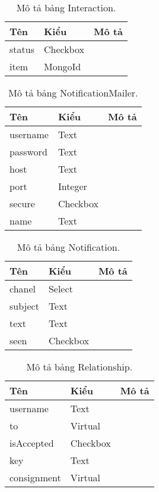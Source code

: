 \begin{table}[h!]
\begin{center}
\begin{tabular}{ |l|l|l| } 
	\hline
	Tên & Kiểu & Mô tả \\
	\hline
	status & Checkbox & \dotfill \\
item & MongoId & \dotfill \\ 
	\hline
\end{tabular}
	\caption{Mô tả bảng Interaction.}
	\label{table:Interaction}
\end{center}
\end{table}


\begin{table}[h!]
\begin{center}
\begin{tabular}{ |l|l|l| } 
	\hline
	Tên & Kiểu & Mô tả \\
	\hline
	username & Text & \dotfill \\
password & Text & \dotfill \\
host & Text & \dotfill \\
port & Integer & \dotfill \\
secure & Checkbox & \dotfill \\
name & Text & \dotfill \\ 
	\hline
\end{tabular}
	\caption{Mô tả bảng NotificationMailer.}
	\label{table:NotificationMailer}
\end{center}
\end{table}


\begin{table}[h!]
\begin{center}
\begin{tabular}{ |l|l|l| } 
	\hline
	Tên & Kiểu & Mô tả \\
	\hline
	chanel & Select & \dotfill \\
subject & Text & \dotfill \\
text & Text & \dotfill \\
seen & Checkbox & \dotfill \\ 
	\hline
\end{tabular}
	\caption{Mô tả bảng Notification.}
	\label{table:Notification}
\end{center}
\end{table}


\begin{table}[h!]
\begin{center}
\begin{tabular}{ |l|l|l| } 
	\hline
	Tên & Kiểu & Mô tả \\
	\hline
	username & Text & \dotfill \\
to & Virtual & \dotfill \\
isAccepted & Checkbox & \dotfill \\
key & Text & \dotfill \\
consignment & Virtual & \dotfill \\ 
	\hline
\end{tabular}
	\caption{Mô tả bảng Relationship.}
	\label{table:Relationship}
\end{center}
\end{table}



